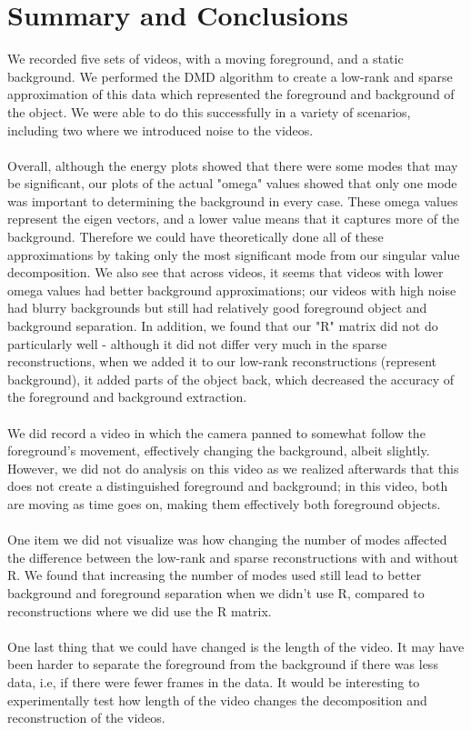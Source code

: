 \documentclass{article}
\begin{document}
\section*{\fontsize{19}{15}\selectfont Summary and Conclusions}
We recorded five sets of videos, with a moving foreground, and a static background. We performed the DMD algorithm to create a low-rank and sparse approximation of this data which represented the foreground and background of the object. We were able to do this successfully in a variety of scenarios, including two where we introduced noise to the videos. \\ \\
Overall, although the energy plots showed that there were some modes that may be significant, our plots of the actual "omega" values showed that only one mode was important to determining the background in every case. These omega values represent the eigen vectors, and a lower value means that it captures more of the background. Therefore we could have theoretically done all of these approximations by taking only the most significant mode from our singular value decomposition. We also see that across videos, it seems that videos with lower omega values had better background approximations; our videos with high noise had blurry backgrounds but still had relatively good foreground object and background separation. In addition, we found that our "R" matrix did not do particularly well - although it did not differ very much in the sparse reconstructions, when we added it to our low-rank reconstructions (represent background), it added parts of the object back, which decreased the accuracy of the foreground and background extraction. \\ \\
We did record a video in which the camera panned to somewhat follow the foreground's movement, effectively changing the background, albeit slightly. However, we did not do analysis on this video as we realized afterwards that this does not create a distinguished foreground and background; in this video, both are moving as time goes on, making them effectively both foreground objects. \\ \\
One item we did not visualize was how changing the number of modes affected the difference between the low-rank and sparse reconstructions with and without R. We found that increasing the number of modes used still lead to better background and foreground separation when we didn't use R, compared to reconstructions where we did use the R matrix. \\ \\ 
One last thing that we could have changed is the length of the video. It may have been harder to separate the foreground from the background if there was less data, i.e, if there were fewer frames in the data. It would be interesting to experimentally test how length of the video changes the decomposition and reconstruction of the videos. \\ \\
\pagebreak
\end{document}
